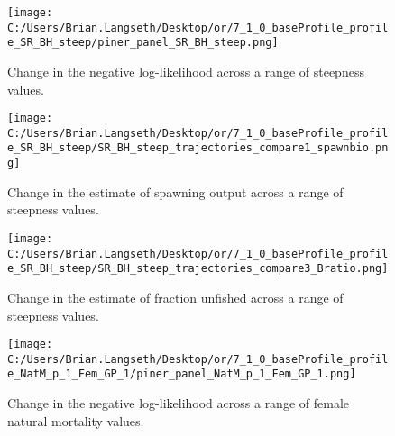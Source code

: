 \documentclass[11pt,
  english,
  a4paper,
]{article}
\begin{document}
\tagmcend\tagstructend


\begin{figure}
\centering
\texttt{[image: C:/Users/Brian.Langseth/Desktop/or/7\_1\_0\_baseProfile\_profile\_SR\_BH\_steep/piner\_panel\_SR\_BH\_steep.png]}
\caption{Change in the negative log-likelihood across a range of steepness values.\label{fig:h-profile}}
\end{figure}

\tagmcend\tagstructend


\begin{figure}
\centering
\texttt{[image: C:/Users/Brian.Langseth/Desktop/or/7\_1\_0\_baseProfile\_profile\_SR\_BH\_steep/SR\_BH\_steep\_trajectories\_compare1\_spawnbio.png]}
\caption{Change in the estimate of spawning output across a range of steepness values.\label{fig:h-ssb}}
\end{figure}

\tagmcend\tagstructend


\begin{figure}
\centering
\texttt{[image: C:/Users/Brian.Langseth/Desktop/or/7\_1\_0\_baseProfile\_profile\_SR\_BH\_steep/SR\_BH\_steep\_trajectories\_compare3\_Bratio.png]}
\caption{Change in the estimate of fraction unfished across a range of steepness values.\label{fig:h-depl}}
\end{figure}

\tagmcend\tagstructend


\begin{figure}
\centering
\texttt{[image: C:/Users/Brian.Langseth/Desktop/or/7\_1\_0\_baseProfile\_profile\_NatM\_p\_1\_Fem\_GP\_1/piner\_panel\_NatM\_p\_1\_Fem\_GP\_1.png]}
\caption{Change in the negative log-likelihood across a range of female natural mortality values.\label{fig:m-profile}}
\end{figure}
\end{document}
